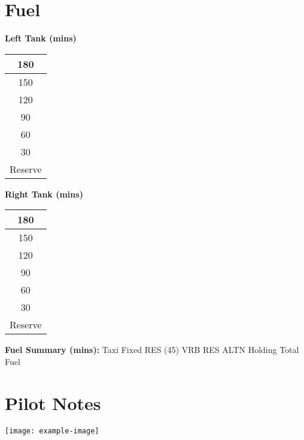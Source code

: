 \documentclass[a5paper,10pt]{article}
\begin{document}
\section*{Fuel}
\begin{multicols}{2}
\textbf{Left Tank (mins)}
\begin{tabular}{|c|}
\hline
180 \\ \hline
150 \\ \hline
120 \\ \hline
90 \\ \hline
60 \\ \hline
30 \\ \hline
Reserve \\ \hline
\end{tabular}

\columnbreak

\textbf{Right Tank (mins)}
\begin{tabular}{|c|}
\hline
180 \\ \hline
150 \\ \hline
120 \\ \hline
90 \\ \hline
60 \\ \hline
30 \\ \hline
Reserve \\ \hline
\end{tabular}
\end{multicols}

\vspace{0.5cm}
\noindent \textbf{Fuel Summary (mins):} Taxi \hspace{1.5cm} Fixed RES (45) \hspace{1.5cm} VRB RES \hspace{1.5cm} ALTN \hspace{1.5cm} Holding \hspace{1.5cm} Total Fuel

\vspace{0.5cm}
\section*{Pilot Notes}
\vspace{3cm}

\texttt{[image: example-image]}
\end{document}
